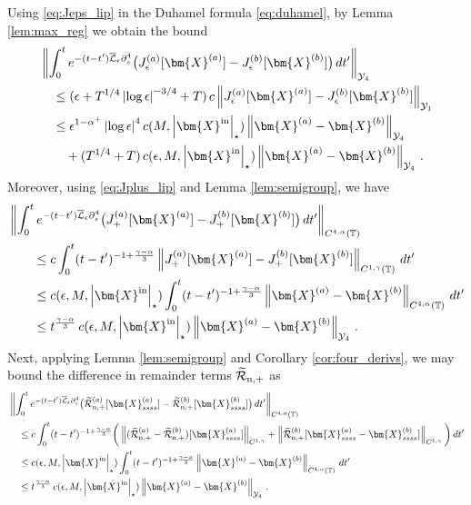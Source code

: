\documentclass[11pt,reqno]{amsart}
\newcommand{\T}{\mathbb{T}}
\newcommand{\X}{\bm{X}}
\newcommand{\p}{\partial}
\newcommand{\abs}[1]{\left\lvert #1 \right\rvert}
\newcommand{\norm}[1]{\left\lVert #1 \right\rVert}
\newcommand{\wt}[1]{\widetilde{#1}}
\newcommand{\mc}[1]{\mathcal{#1}}
\theoremstyle{definition}
\begin{document}
Using \eqref{eq:Jeps_lip} in the Duhamel formula \eqref{eq:duhamel}, by Lemma \ref{lem:max_reg} we obtain the bound
\begin{equation}
\begin{aligned}
  &\norm{\int_0^t e^{-(t-t')\overline{\mc{L}}_\epsilon\p_s^4}\big(J_\epsilon^{(a)}[\X^{(a)}] - J_\epsilon^{(b)}[\X^{(b)}]\big)\,dt'}_{\mc{Y}_4} \\
  &\quad \le (\epsilon + T^{1/4}\abs{\log\epsilon}^{-3/4}+T)\,c\norm{J_\epsilon^{(a)}[\X^{(a)}]- J_\epsilon^{(b)}[\X^{(b)}]}_{\mc{Y}_1}\\
  &\quad \le \epsilon^{1-\alpha^+}\abs{\log\epsilon}^4c(M,\abs{\X^{\rm in}}_\star)\norm{\X^{(a)}-\X^{(b)}}_{\mc{Y}_4}\\
  &\qquad
  + (T^{1/4}+T)\,c(\epsilon,M,\abs{\X^{\rm in}}_\star)\norm{\X^{(a)}-\X^{(b)}}_{\mc{Y}_4}\,.
\end{aligned}
\end{equation}
%
%
Moreover, using \eqref{eq:Jplus_lip} and Lemma \ref{lem:semigroup}, we have 
\begin{equation}
\begin{aligned}
  &\norm{\int_0^t e^{-(t-t')\overline{\mc{L}}_\epsilon\p_s^4}\big(J_+^{(a)}[\X^{(a)}]-J_+^{(b)}[\X^{(b)}]\big)\,dt'}_{C^{4,\alpha}(\T)}\\
  &\qquad \le c\int_0^t(t-t')^{-1+\frac{\gamma-\alpha}{3}}\norm{J_+^{(a)}[\X^{(a)}]-J_+^{(b)}[\X^{(b)}]}_{C^{1,\gamma}(\T)}\,dt'\\
  &\qquad \le c(\epsilon,M,\abs{\X^{\rm in}}_\star)\int_0^t(t-t')^{-1+\frac{\gamma-\alpha}{3}}\norm{\X^{(a)}-\X^{(b)}}_{C^{4,\alpha}(\T)}\,dt'\\
  &\qquad \le t^{\frac{\gamma-\alpha}{3}}\,c(\epsilon,M,\abs{\X^{\rm in}}_\star)\norm{\X^{(a)}-\X^{(b)}}_{\mc{Y}_4}\,.
\end{aligned}
\end{equation}
%
%
Next, applying Lemma \ref{lem:semigroup} and Corollary \ref{cor:four_derivs}, we may bound the difference in remainder terms $\wt{\mc{R}}_{\rm n,+}$ as 
\begin{equation}
\begin{aligned}
  &\norm{\int_0^t e^{-(t-t')\overline{\mc{L}}_\epsilon\p_s^4}\big(\wt{\mc{R}}_{\rm n,+}^{(a)}[\X_{ssss}^{(a)}]- \wt{\mc{R}}_{\rm n,+}^{(b)}[\X_{ssss}^{(b)}]\big)\,dt'}_{C^{4,\alpha}(\T)} \\
  &\quad \le c\int_0^t (t-t')^{-1+\frac{\gamma-\alpha}{3}}\bigg(\norm{(\wt{\mc{R}}_{\rm n,+}^{(a)}-\wt{\mc{R}}_{\rm n,+}^{(b)})[\X_{ssss}^{(a)}]}_{C^{1,\gamma}} + \norm{\wt{\mc{R}}_{\rm n,+}^{(b)}[\X_{ssss}^{(a)}-\X_{ssss}^{(b)}]}_{C^{1,\gamma}}\bigg)\,dt' \\
  &\quad \le c(\epsilon,M,\abs{\X^{\rm in}}_\star)\int_0^t (t-t')^{-1+\frac{\gamma-\alpha}{3}}\norm{\X^{(a)}-\X^{(b)}}_{C^{4,\alpha}(\T)}\,dt' \\
  &\quad \le t^{\frac{\gamma-\alpha}{3}}\,c(\epsilon,M,\abs{\X^{\rm in}}_\star)\norm{\X^{(a)}-\X^{(b)}}_{\mc{Y}_4} \,.
\end{aligned}
\end{equation}
\end{document}
